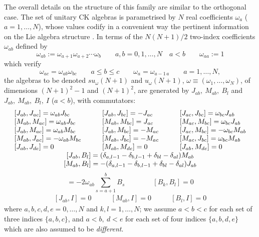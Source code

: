\documentclass[12pt]{article}
\begin{document}
The overall details on the structure of this family are similar
to the orthogonal case. The set of unitary CK algebras is parametrised by
$N$ real coefficients ${\omega}_a$ ($a=1,\dots,N$), whose values codify in a
convenient way the pertinent information on the Lie algebra structure
\cite{Her:95,Her.San:96}. In terms of the $N(N+1)/2$
two-index coefficients
${\omega}_{ab}$ defined by
\begin{equation}
{\omega}_{ab}:={\omega}_{a+1}{\omega}_{a+2}\cdots{\omega}_b  \qquad
  a,b=0,1,\dots,N  \quad
  a<b  \qquad
{\omega}_{aa}:=1
\label{aa}
\end{equation}
which verify
\begin{equation}
{\omega}_{ac}={\omega}_{ab}{\omega}_{bc}  \qquad
  a \leq b \leq c  \qquad
{\omega}_{a}={\omega}_{a-1\, a}  \qquad
  a=1,\dots,N,
\label{ab}
\end{equation}
the algebras to be denoted $su_{\omega}(N+1)$ and $u_{\omega}(N+1)$,
${\omega} \equiv ({\omega}_1,\dots,{\omega}_N)$, of
dimensions $(N+1)^2-1$ and $(N+1)^2$, are generated by ${J}_{ab},\
{M}_{ab},\ {B}_l$ and ${J}_{ab},\ {M}_{ab},\ {B}_l,\ {I}$ ($a<b$), with commutators:
\begin{equation}
\begin{array}{lll}
[{J}_{ab},{J}_{ac}] ={\omega}_{ab}{J}_{bc} &\qquad
[{J}_{ab},{J}_{bc}] =-{J}_{ac} &\qquad
[{J}_{ac},{J}_{bc}] ={\omega}_{bc}{J}_{ab}\\{}
[{M}_{ab},{M}_{ac}] ={\omega}_{ab}{J}_{bc} &\qquad
[{M}_{ab},{M}_{bc}] ={J}_{ac} &\qquad
[{M}_{ac},{M}_{bc}] ={\omega}_{bc}{J}_{ab} \\{}
[{J}_{ab},{M}_{ac}] ={\omega}_{ab}{M}_{bc} &\qquad
[{J}_{ab},{M}_{bc}] =-{M}_{ac} &\qquad
[{J}_{ac},{M}_{bc}] =-{\omega}_{bc}{M}_{ab}\\{}
[{M}_{ab},{J}_{ac}] =-{\omega}_{ab}{M}_{bc} &\qquad
[{M}_{ab},{J}_{bc}] =-{M}_{ac} &\qquad
[{M}_{ac},{J}_{bc}] ={\omega}_{bc}{M}_{ab} \\{}
[{J}_{ab},{J}_{de}]= 0 &\qquad
[{M}_{ab},{M}_{de}] =0 &\qquad
[{J}_{ab},{M}_{de}] =0 \\
\multicolumn{3}{c}{
   [{J}_{ab},{B}_l] = ( \delta_{a,l-1} -\delta_{b,l-1}  +
    \delta_{bl} -\delta_{al}){M}_{ab}} \\
\multicolumn{3}{c}{
   [{M}_{ab},{B}_l] = - ( \delta_{a,l-1} -\delta_{b,l-1}  +
    \delta_{bl} -\delta_{al}){J}_{ab}} \\
\end{array}
\label{CKusuCR}
\end{equation}
\begin{equation}
[{J}_{ab},{M}_{ab}] =-2{\omega}_{ab}\sum_{s=a+1}^b {B}_s  \qquad\qquad
[{B}_{k},{B}_{l}]=0
\label{CKsuCR}
\end{equation}
\begin{equation}
\begin{array}{lll}
[{J}_{ab},{I}] = 0 & \qquad
[{M}_{ab},{I}] = 0 & \qquad
[{B}_l,{I}] = 0
\label{CKuCR}
\end{array}
\end{equation}
where $a, b, c, d, e=0, \dots, N$ and $k, l=1, \dots, N$; we assume
$a<b<c$ for each set of three  indices  $\{a,b,c\}$, and $a<b,\ d<e$
for each set of four indices $\{a,b,d,e\}$ which are also assumed to
be \emph{different}.
\end{document}
